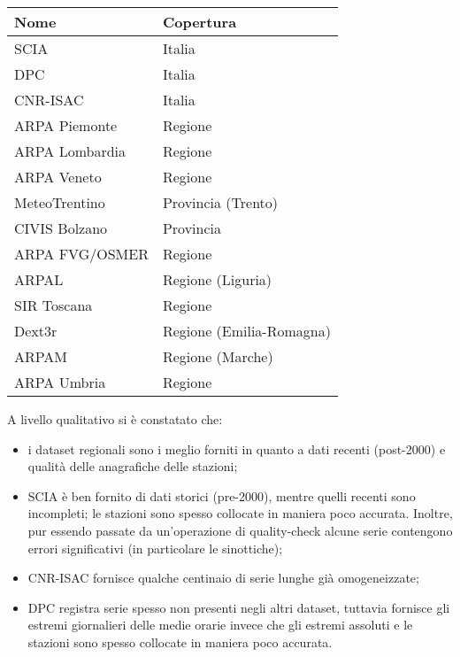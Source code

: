 \begin{table}[h]
  \centering
  \begin{tabular}{l l}
    \toprule
    Nome & Copertura \\
    \midrule
    SCIA & Italia \\
    DPC & Italia \\
    CNR-ISAC & Italia \\
    ARPA Piemonte & Regione \\
    ARPA Lombardia & Regione \\
    ARPA Veneto & Regione \\
    MeteoTrentino & Provincia (Trento) \\
    CIVIS Bolzano & Provincia \\
    ARPA FVG/OSMER & Regione \\
    ARPAL & Regione (Liguria) \\
    SIR Toscana & Regione \\
    Dext3r & Regione (Emilia-Romagna) \\
    ARPAM & Regione (Marche) \\
    ARPA Umbria & Regione \\
    \bottomrule
  \end{tabular}
\end{table}

A livello qualitativo si è constatato che:

\begin{itemize}
  \item
    i dataset regionali sono i meglio forniti in quanto a dati recenti (post-2000) e qualità delle anagrafiche delle stazioni;
  \item
    SCIA è ben fornito di dati storici (pre-2000), mentre quelli recenti sono incompleti; le stazioni sono spesso collocate in maniera poco accurata. Inoltre, pur essendo passate da un'operazione di quality-check alcune serie contengono errori significativi (in particolare le sinottiche);
  \item
    CNR-ISAC fornisce qualche centinaio di serie lunghe già omogeneizzate;
  \item
    DPC registra serie spesso non presenti negli altri dataset, tuttavia fornisce gli estremi giornalieri delle medie orarie invece che gli estremi assoluti e le stazioni sono spesso collocate in maniera poco accurata.
\end{itemize}

